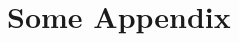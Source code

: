 \documentclass[main.tex]{subfiles}
\begin{document}
\appendix

\section{Some Appendix}
\end{document}
